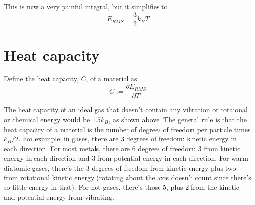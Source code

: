 \documentclass[12pt]{article}
\begin{document}
This is now a very painful integral, but it simplifies to
\[E_{RMS} = \frac{3}{2} k_B T\]

\section{Heat capacity}
Define the heat capacity, $C$, of a material as
\[C := \frac{\partial E_{RMS}}{\partial T} \]

The heat capacity of an ideal gas that doesn't contain any vibration or rotaional or chemical energy would be $1.5 k_B$, as shown above. The general rule is that the heat capacity of a material is the number of degrees of freedom per particle times $k_B / 2$. For example, in gases, there are 3 degrees of freedom: kinetic energy in each direction. For most metals, there are 6 degrees of freedom: 3 from kinetic energy in each direction and 3 from potential energy in each direction. For warm diatomic gases, there's the 3 degrees of freedom from kinetic energy plus two from rotational kinetic energy (rotating about the axis doesn't count since there's so little energy in that). For hot gases, there's those 5, plus 2 from the kinetic and potential energy from vibrating.
\end{document}
